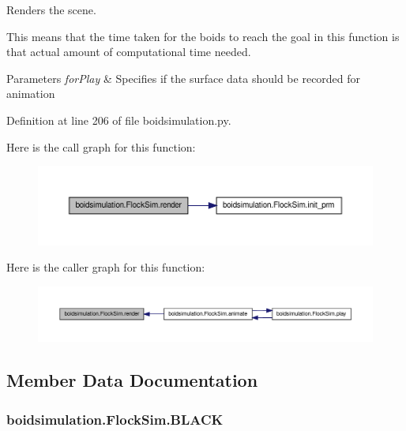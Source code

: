 Renders the scene. 

This means that the time taken for the boids to reach the goal in this function is that actual amount of computational time needed. 
\begin{DoxyParams}{Parameters}
{\em for\-Play} & Specifies if the surface data should be recorded for animation \\
\hline
\end{DoxyParams}


Definition at line 206 of file boidsimulation.\-py.



Here is the call graph for this function\-:
\nopagebreak
\begin{figure}[H]
\begin{center}
\leavevmode
\includegraphics[width=350pt]{classboidsimulation_1_1FlockSim_a3c456990ff58b2a5dfae2dd2b5b6d294_cgraph}
\end{center}
\end{figure}




Here is the caller graph for this function\-:
\nopagebreak
\begin{figure}[H]
\begin{center}
\leavevmode
\includegraphics[width=350pt]{classboidsimulation_1_1FlockSim_a3c456990ff58b2a5dfae2dd2b5b6d294_icgraph}
\end{center}
\end{figure}




\subsection{Member Data Documentation}
\hypertarget{classboidsimulation_1_1FlockSim_ac9c61aa93f3db94b9a340b8555d90adf}{
\subsubsection[{B\-L\-A\-C\-K}]{\setlength{\rightskip}{0pt plus 5cm}boidsimulation.\-Flock\-Sim.\-B\-L\-A\-C\-K}}\label{classboidsimulation_1_1FlockSim_ac9c61aa93f3db94b9a340b8555d90adf}


